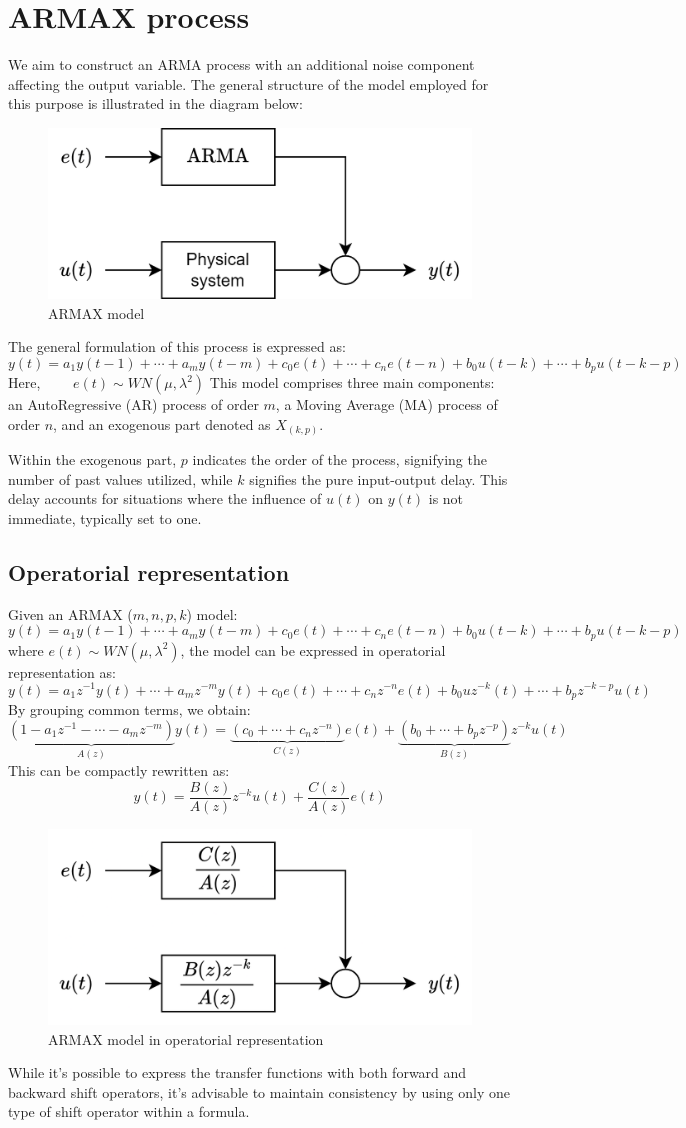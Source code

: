 \section{ARMAX process}

We aim to construct an ARMA process with an additional noise component affecting the output variable. 
The general structure of the model employed for this purpose is illustrated in the diagram below:
\begin{figure}[H]
    \centering
    \includegraphics[width=0.5\linewidth]{images/armax.png}
    \caption{ARMAX model}
\end{figure}
The general formulation of this process is expressed as:
\[y(t)=a_1y(t-1)+\cdots+a_m y(t-m)+c_0e(t)+\cdots+c_n e(t-n)+b_0u(t-k)+\cdots+b_p u(t-k-p)\] 
Here, $\qquad e(t)\sim WN(\mu,\lambda^2)$
This model comprises three main components: an AutoRegressive (AR) process of order $m$, a Moving Average (MA) process of order $n$, and an exogenous part denoted as $X_{(k,p)}$.

Within the exogenous part, $p$ indicates the order of the process, signifying the number of past values utilized, while $k$ signifies the pure input-output delay. 
This delay accounts for situations where the influence of $u(t)$ on $y(t)$ is not immediate, typically set to one.

\subsection{Operatorial representation}
Given an ARMAX ($m,n,p,k$) model:
\[y(t)=a_1y(t-1)+\cdots+a_m y(t-m)+c_0e(t)+\cdots+c_n e(t-n)+b_0u(t-k)+\cdots+b_p u(t-k-p)\] 
where $e(t)\sim WN(\mu,\lambda^2)$, the model can be expressed in operatorial representation as:
\[y(t)=a_1z^{-1}y(t)+\cdots+a_m z^{-m}y(t)+c_0e(t)+\cdots+c_n z^{-n}e(t)+b_0uz^{-k}(t)+\cdots+b_p z^{-k-p}u(t)\]
By grouping common terms, we obtain:
\[\underbrace{\left(1-a_1z^{-1}-\cdots-a_m z^{-m}\right)}_{A(z)} y(t)=\underbrace{\left(c_0+\cdots+c_n z^{-n}\right)}_{C(z)} e(t)+\underbrace{\left(b_0+\cdots+b_p z^{-p}\right)}_{B(z)} z^{-k}u(t)\]
This can be compactly rewritten as:
\[y(t)=\dfrac{B(z)}{A(z)}z^{-k}u(t)+\dfrac{C(z)}{A(z)}e(t)\]
\begin{figure}[H]
    \centering
    \includegraphics[width=0.5\linewidth]{images/armaxblock.png}
    \caption{ARMAX model in operatorial representation}
\end{figure}
While it's possible to express the transfer functions with both forward and backward shift operators, it's advisable to maintain consistency by using only one type of shift operator within a formula.